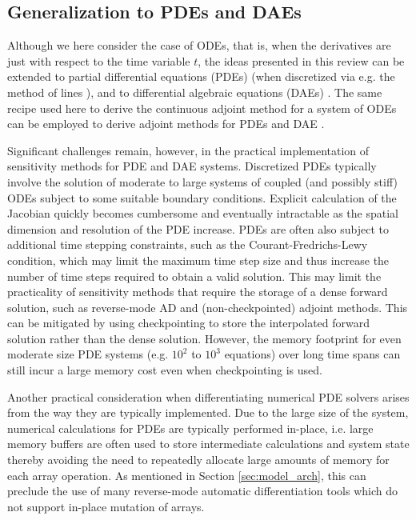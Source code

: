 
\subsection{Generalization to PDEs and DAEs}



Although we here consider the case of ODEs, that is, when the derivatives are just with respect to the time variable $t$, the ideas presented in this review can be extended to partial differential equations (PDEs) (when discretized via e.g. the method of lines \cite{ascher2008numerical}), and to differential algebraic equations (DAEs) \cite{hairer-solving-2}.
The same recipe used here to derive the continuous adjoint method for a system of ODEs can be employed to derive adjoint methods for PDEs \cite{Giles_Pierce_2000} and DAE \cite{Cao_Li_Petzold_2002}. 

Significant challenges remain, however, in the practical implementation of sensitivity methods for PDE and DAE systems. 
Discretized PDEs typically involve the solution of moderate to large systems of coupled (and possibly stiff) ODEs subject to some suitable boundary conditions. 
Explicit calculation of the Jacobian quickly becomes cumbersome and eventually intractable as the spatial dimension and resolution of the PDE increase.
PDEs are often also subject to additional time stepping constraints, such as the Courant-Fredrichs-Lewy condition, which may limit the maximum time step size and thus increase the number of time steps required to obtain a valid solution. 
This may limit the practicality of sensitivity methods that require the storage of a dense forward solution, such as reverse-mode AD and (non-checkpointed) adjoint methods.
This can be mitigated by using checkpointing to store the interpolated forward solution rather than the dense solution.
However, the memory footprint for even moderate size PDE systems (e.g. $10^2$ to $10^3$ equations) over long time spans can still incur a large memory cost even when checkpointing is used.

Another practical consideration when differentiating numerical PDE solvers arises from the way they are typically implemented. 
Due to the large size of the system, numerical calculations for PDEs are typically performed in-place, i.e. large memory buffers are often used to store intermediate calculations and system state thereby avoiding the need to repeatedly allocate large amounts of memory for each array operation. 
As mentioned in Section \ref{sec:model_arch}, this can preclude the use of many reverse-mode automatic differentiation tools which do not support in-place mutation of arrays.

